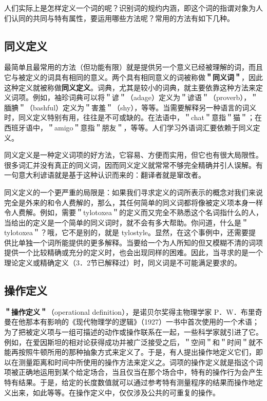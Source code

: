 人们实际上是怎样定义一个词的呢？识别词的规约内涵，即这个词的指谓对象为人们认同的共同与特有属性，要运用哪些方法呢？常用的方法有如下几种。

\subsection{同义定义}

最简单且最常用的方法（但功能有限）就是提供另一个意义已经被理解的词，而且它与被定义的词具有相同的意义。两个具有相同意义的词被称做\textbf{＂同义词＂}，因此这种定义就被称做\textbf{同义定义}。词典，尤其是较小的词典，就主要依靠这种方法来定义词项。例如，袖珍词典可以将＂谚＂（adage）定义为＂谚语＂（proverb），＂腼腆＂（bashful）定义为＂害羞＂（shy），等等。当需要解释另一种语言的词义时，同义定义特别有用，往往是不可或缺的。在法语中，＂chat＂意指＂猫＂；在西班牙语中，＂amigo＂意指＂朋友＂，等等。人们学习外语词汇要依赖于同义定义。

同义定义是一种定义词项的好方法，它容易、方便而实用，但它也有很大局限性。很多词汇并没有真正的同义词，因而同义定义就常常不够完全精确并引人误解。有一句意大利谚语就是基于这种认识而来的：翻译者就是窜改者。

同义定义的一个更严重的局限是：如果我们寻求定义的词所表示的概念对我们来说完全是外来的和令人费解的，那么，其任何简单的同义词都将像被定义项本身一样令人费解。例如，需要＂tylotoxea＂的定义而又完全不熟悉这个名词指什么的人，当给出的定义是一个简单的同义词时，就不会有多大帮助。你问道，什么是＂tylotoxea＂？哦，它不是别的，就是 tylostyle。显然，在这个事例中，还需要提供比单独一个词所能提供的更多解释。当要给一个为人所知的但又模糊不清的词项提供一个比较精确或充分的定义时，也会出现同样的困难。因此，当寻求的是一个理论定义或精确定义（3．2节已解释过）时，同义词是不可能满足要求的。

\subsection{操作定义}

\textbf{＂操作定义＂}（operational definition），是诺贝尔奖得主物理学家 P．W．布里奇曼在他那本有影响的《现代物理学的逻辑》（1927）一书中首次使用的一个术语；为了把被定义项与一组可描述的动作或操作联系在一起，一些科学家就引进了它。例如，在爱因斯坦的相对论获得成功并被广泛接受之后，＂空间＂和＂时间＂就不能再按照牛顿所用的那种抽象方式来定义了。于是，有人提出操作地定义它们，即以在测量距离和时间中所使用的操作方法来定义之。词项的操作定义就是指这个词项被正确地运用到某个给定场合，当且仅当在那个场合中，特有的操作行为会产生特有结果。于是，给定的长度数值就可以通过参考特有测量程序的结果而操作地定义出来，如此等等。在操作定义中，仅仅涉及公共的可重复的操作。

